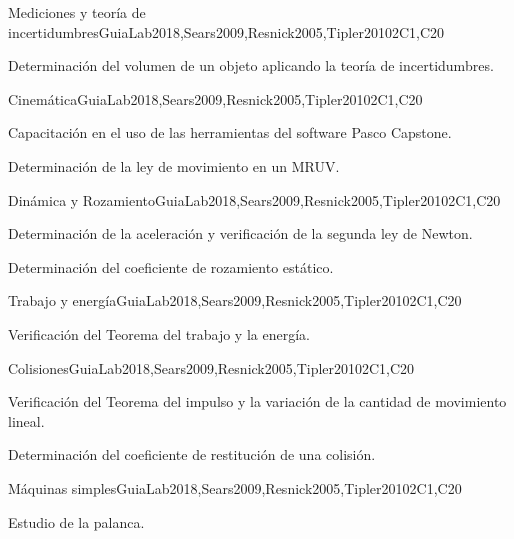 \begin{syllabus}
\begin{unit}{Mediciones y teoría de incertidumbres}{}{GuiaLab2018,Sears2009,Resnick2005,Tipler2010}{2}{C1,C20}
\begin{topics}
      \item Determinación del volumen de un objeto aplicando la teoría de incertidumbres.
\end{topics}
\end{unit}

\begin{unit}{Cinemática}{}{GuiaLab2018,Sears2009,Resnick2005,Tipler2010}{2}{C1,C20}
\begin{topics}
      \item Capacitación en el uso de las herramientas del software Pasco Capstone.
      \item Determinación de la ley de movimiento en un MRUV.
\end{topics}
\end{unit}

\begin{unit}{Dinámica y Rozamiento}{}{GuiaLab2018,Sears2009,Resnick2005,Tipler2010}{2}{C1,C20}
\begin{topics}
      \item Determinación de la aceleración y verificación de la segunda ley de Newton. 
      \item Determinación del coeficiente de rozamiento estático.
\end{topics}
\end{unit}

\begin{unit}{Trabajo y energía}{}{GuiaLab2018,Sears2009,Resnick2005,Tipler2010}{2}{C1,C20}
\begin{topics}
      \item Verificación del Teorema del trabajo y la energía.
   \end{topics}
\end{unit}

\begin{unit}{Colisiones}{}{GuiaLab2018,Sears2009,Resnick2005,Tipler2010}{2}{C1,C20}
\begin{topics}
	\item Verificación del Teorema del impulso y la variación de la cantidad de movimiento lineal. 
	\item Determinación del coeficiente de restitución de una colisión.
   \end{topics}
\end{unit}

\begin{unit}{Máquinas simples}{}{GuiaLab2018,Sears2009,Resnick2005,Tipler2010}{2}{C1,C20}
   \begin{topics}
	\item Estudio de la palanca.
   \end{topics}
\end{unit}

\begin{coursebibliography}
\end{coursebibliography}

\end{syllabus}
